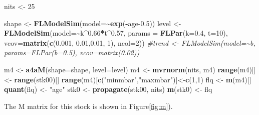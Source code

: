 \documentclass[
]{book}
\newenvironment{Shaded}{\begin{snugshade}}{\end{snugshade}}
\newcommand{\AttributeTok}[1]{\textcolor[rgb]{0.13,0.29,0.53}{#1}}
\newcommand{\CommentTok}[1]{\textcolor[rgb]{0.56,0.35,0.01}{\textit{#1}}}
\newcommand{\DecValTok}[1]{\textcolor[rgb]{0.00,0.00,0.81}{#1}}
\newcommand{\FloatTok}[1]{\textcolor[rgb]{0.00,0.00,0.81}{#1}}
\newcommand{\FunctionTok}[1]{\textcolor[rgb]{0.13,0.29,0.53}{\textbf{#1}}}
\newcommand{\NormalTok}[1]{#1}
\newcommand{\OtherTok}[1]{\textcolor[rgb]{0.56,0.35,0.01}{#1}}
\newcommand{\SpecialCharTok}[1]{\textcolor[rgb]{0.81,0.36,0.00}{\textbf{#1}}}
\newcommand{\StringTok}[1]{\textcolor[rgb]{0.31,0.60,0.02}{#1}}
\begin{document}
\begin{Shaded}
\begin{Highlighting}[]
\NormalTok{nits }\OtherTok{\textless{}{-}} \DecValTok{25}

\NormalTok{shape }\OtherTok{\textless{}{-}} \FunctionTok{FLModelSim}\NormalTok{(}\AttributeTok{model=}\SpecialCharTok{\textasciitilde{}}\FunctionTok{exp}\NormalTok{(}\SpecialCharTok{{-}}\NormalTok{age}\FloatTok{{-}0.5}\NormalTok{))}
\NormalTok{level }\OtherTok{\textless{}{-}} \FunctionTok{FLModelSim}\NormalTok{(}\AttributeTok{model=}\SpecialCharTok{\textasciitilde{}}\NormalTok{k}\SpecialCharTok{\^{}}\FloatTok{0.66}\SpecialCharTok{*}\NormalTok{t}\SpecialCharTok{\^{}}\FloatTok{0.57}\NormalTok{, }\AttributeTok{params =} \FunctionTok{FLPar}\NormalTok{(}\AttributeTok{k=}\FloatTok{0.4}\NormalTok{, }\AttributeTok{t=}\DecValTok{10}\NormalTok{),}
                     \AttributeTok{vcov=}\FunctionTok{matrix}\NormalTok{(}\FunctionTok{c}\NormalTok{(}\FloatTok{0.001}\NormalTok{, }\FloatTok{0.01}\NormalTok{,}\FloatTok{0.01}\NormalTok{, }\DecValTok{1}\NormalTok{), }\AttributeTok{ncol=}\DecValTok{2}\NormalTok{))}
\CommentTok{\#trend \textless{}{-} FLModelSim(model=\textasciitilde{}b, params=FLPar(b=0.5), vcov=matrix(0.02))}

\NormalTok{m4 }\OtherTok{\textless{}{-}} \FunctionTok{a4aM}\NormalTok{(}\AttributeTok{shape=}\NormalTok{shape, }\AttributeTok{level=}\NormalTok{level)}
\NormalTok{m4 }\OtherTok{\textless{}{-}} \FunctionTok{mvrnorm}\NormalTok{(nits, m4)}
\FunctionTok{range}\NormalTok{(m4)[] }\OtherTok{\textless{}{-}} \FunctionTok{range}\NormalTok{(stk00)[]}
\FunctionTok{range}\NormalTok{(m4)[}\FunctionTok{c}\NormalTok{(}\StringTok{"minmbar"}\NormalTok{,}\StringTok{"maxmbar"}\NormalTok{)]}\OtherTok{\textless{}{-}}\FunctionTok{c}\NormalTok{(}\DecValTok{1}\NormalTok{,}\DecValTok{1}\NormalTok{)}
\NormalTok{flq }\OtherTok{\textless{}{-}} \FunctionTok{m}\NormalTok{(m4)[]}
\FunctionTok{quant}\NormalTok{(flq) }\OtherTok{\textless{}{-}} \StringTok{"age"}
\NormalTok{stk0 }\OtherTok{\textless{}{-}} \FunctionTok{propagate}\NormalTok{(stk00, nits)}
\FunctionTok{m}\NormalTok{(stk0) }\OtherTok{\textless{}{-}}\NormalTok{ flq}
\end{Highlighting}
\end{Shaded}

The M matrix for this stock is shown in Figure\ref{fig:m}).
\end{document}
